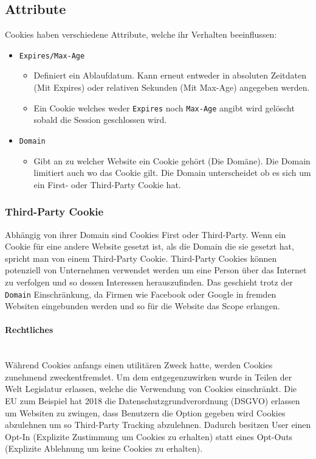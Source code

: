 \documentclass{article}
\newcommand{\paragraphlb}[1]{\paragraph{#1}\mbox{}\\}
\begin{document}
\begin{itemize}
	\subsection{Attribute}
	Cookies haben verschiedene Attribute, welche ihr Verhalten beeinflussen:
	\begin{itemize}
		\item{\texttt{Expires/Max-Age}}
		\begin{itemize}
			\item{Definiert ein Ablaufdatum. Kann erneut entweder in absoluten Zeitdaten (Mit Expires) oder relativen Sekunden (Mit Max-Age) angegeben werden.}
			\item{Ein Cookie welches weder \texttt{Expires} noch \texttt{Max-Age} angibt wird gelöscht sobald die Session geschlossen wird.}
		\end{itemize}
		\item{\texttt{Domain}}
		\begin{itemize}
			\item{Gibt an zu welcher Website ein Cookie gehört (Die Domäne). Die Domain limitiert auch wo das Cookie gilt. Die Domain unterscheidet ob es sich um ein First- oder Third-Party Cookie hat.}
		\end{itemize}
	\end{itemize}
	\subsubsection{Third-Party Cookie}
	Abhängig von ihrer Domain sind Cookies First oder Third-Party. Wenn ein Cookie für eine andere Website gesetzt ist, als die Domain die sie gesetzt hat, spricht man von einem Third-Party Cookie. Third-Party Cookies können potenziell von Unternehmen verwendet werden um eine Person über das Internet zu verfolgen und so dessen Interessen herauszufinden. Das geschieht trotz der \texttt{Domain} Einschränkung, da Firmen wie Facebook oder Google in fremden Websiten eingebunden werden und so für die Website das Scope erlangen.
	\paragraphlb{Rechtliches}
	Während Cookies anfangs einen utilitären Zweck hatte, werden Cookies zunehmend zweckentfremdet. Um dem entgegenzuwirken wurde in Teilen der Welt Legislatur erlassen, welche die Verwendung von Cookies einschränkt. Die EU zum Beispiel hat 2018 die Datenschutzgrundverordnung (DSGVO) erlassen um Websiten zu zwingen, dass Benutzern die Option gegeben wird Cookies abzulehnen um so Third-Party Tracking abzulehnen. Dadurch besitzen User einen Opt-In (Explizite Zustimmung um Cookies zu erhalten) statt eines Opt-Outs (Explizite Ablehnung um keine Cookies zu erhalten).

\end{itemize}
\end{document}
